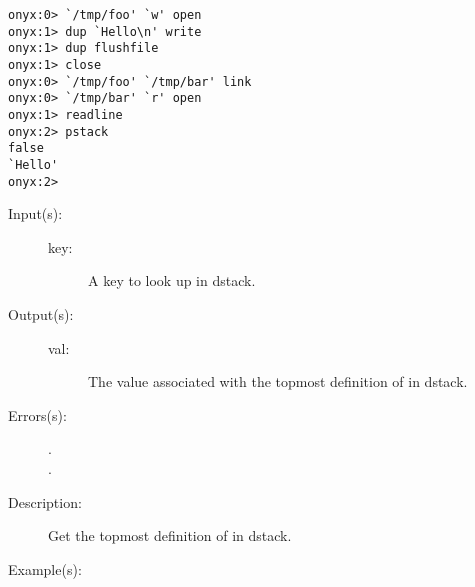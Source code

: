 \begin{description}
\begin{description}
\begin{verbatim}
onyx:0> `/tmp/foo' `w' open
onyx:1> dup `Hello\n' write
onyx:1> dup flushfile
onyx:1> close
onyx:0> `/tmp/foo' `/tmp/bar' link
onyx:0> `/tmp/bar' `r' open
onyx:1> readline
onyx:2> pstack
false
`Hello'
onyx:2>
		\end{verbatim}
	\end{description}
\label{systemdict:load}
\item[{\onyxop{key}{load}{val}}: ]
	\begin{description}\item[]
	\item[Input(s): ]
		\begin{description}\item[]
		\item[key: ]
			A key to look up in dstack.
		\end{description}
	\item[Output(s): ]
		\begin{description}\item[]
		\item[val: ]
			The value associated with the topmost definition of
			 in dstack.
		\end{description}
	\item[Errors(s): ]
		\begin{description}\item[]
		\item[.]
		\item[.]
		\end{description}
	\item[Description: ]
		Get the topmost definition of  in dstack.
	\item[Example(s): ]\begin{verbatim}


\end{verbatim}
\end{description}
\end{description}
